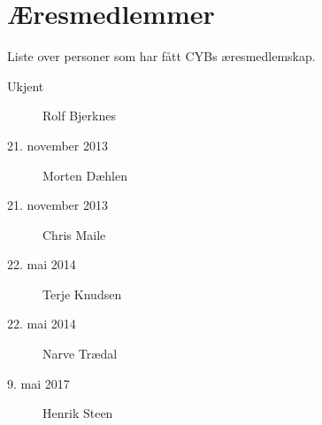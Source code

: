 \chapter*{Æresmedlemmer}

Liste over personer som har fått CYBs æresmedlemskap.

\begin{description}
	\item[Ukjent] Rolf Bjerknes
	\item[21. november 2013] Morten Dæhlen
	\item[21. november 2013] Chris Maile
	\item[22. mai 2014] Terje Knudsen
	\item[22. mai 2014] Narve Trædal
	\item[9. mai 2017] Henrik Steen
\end{description}
